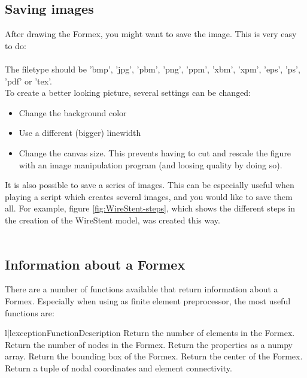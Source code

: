 \subsection{Saving images}
\label{subsec:images}
After drawing the Formex, you might want to save the image. This is very easy to do:\\
\\
The filetype should be 'bmp', 'jpg', 'pbm', 'png', 'ppm', 'xbm', 'xpm', 'eps', 'ps', 'pdf' or 'tex'. \\
To create a better looking picture, several settings can be changed:
\begin{itemize}
	\item Change the background color 
	\item Use a different (bigger) linewidth 
	\item Change the canvas size. This prevents having to cut and rescale the figure with an image manipulation program (and loosing quality by doing so).  
\end{itemize}

It is also possible to save a series of images. This can be especially useful when playing a script which creates several images, and you would like to save them all.  For example, figure \ref{fig:WireStent-steps}, which shows the different steps in the creation of the WireStent model, was created this way.\\
\\


\subsection{Information about a Formex}
\label{subsec:info}
There are a number of functions available that return information about a Formex. Especially when using \pyformex as finite element preprocessor, the most useful functions are:
\begin{tableii}{l|l}{exception}{Function}{Description}
		{Return the number of elements in the Formex.}
		{Return the number of nodes in the Formex.}
		{Return the properties as a numpy array.}
		{Return the bounding box of the Formex.}
		{Return the center of the Formex.}
		{Return a tuple of nodal coordinates and element connectivity.}
\end{tableii}

